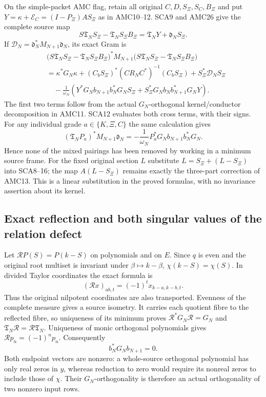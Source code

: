 On the simple-packet AMC flag, retain all original $C,D,S_\Xi,S_C,B_\Xi$
and put $Y=\kappa+\mathcal E_C=(I-P_\Xi)AS_\Xi$ as in AMC10--12.
SCA9 and AMC26 give the complete source map
\[
 S\mathfrak T_NS_\Xi-\mathfrak T_NS_\Xi B_\Xi
             =\mathfrak T_NY+\mathfrak d_NS_\Xi.
 \tag{SCA14}
\]
If $\mathcal D_N=\mathfrak d_N^*M_{N+1}\mathfrak d_N$, its exact Gram is
\[
 \begin{aligned}
 &\bigl(S\mathfrak T_NS_\Xi-\mathfrak T_NS_\Xi B_\Xi\bigr)^*
 M_{N+1}\bigl(S\mathfrak T_NS_\Xi-\mathfrak T_NS_\Xi B_\Xi\bigr)\\
 &=\kappa^*G_N\kappa
 +(C_bS_\Xi)^*(CR_NC^*)^{-1}(C_bS_\Xi)
 +S_\Xi^*\mathcal D_NS_\Xi\\
 &\quad-\frac1{\omega_N}
 \left(Y^*G_Nb_{N+1}b_N^*G_NS_\Xi
      +S_\Xi^*G_Nb_Nb_{N+1}^*G_NY\right).
 \end{aligned}\tag{SCA15}
\]
The first two terms follow from the actual $G_N$-orthogonal kernel/conductor
decomposition in AMC11. SCA12 evaluates both cross terms, with their signs.
For any individual grade $a\in\{K,\Xi,C\}$ the same calculation gives
\[
 (\mathfrak T_NP_a)^*M_{N+1}\mathfrak d_N
   =-\frac1{\omega_N}P_a^*G_Nb_{N+1}b_N^*G_N.
 \tag{SCA16}
\]
Hence none of the mixed pairings has been removed by working in a
minimum source frame. For the fixed original section $L$ substitute
$L=S_\Xi+(L-S_\Xi)$ into SCA8--16; the map $A(L-S_\Xi)$ remains exactly
the three-part correction of AMC13. This is a linear substitution in the
proved formulas, with no invariance assertion about its kernel.

\subsection{Exact reflection and both singular values of the relation defect}

Let $\mathcal R P(S)=P(k-S)$ on polynomials and on $E$. Since $q$ is even
and the original root multiset is invariant under $\beta\mapsto k-\beta$,
$\chi(k-S)=\chi(S)$. In divided Taylor coordinates the exact formula is
\[
 (\mathcal R x)_{ab,t}=(-1)^t x_{k-a,k-b,t}.
 \tag{SCA17}
\]
Thus the original nilpotent coordinates are also transported. Evenness of
the complete measure gives a source isometry. It carries each quotient
fibre to the reflected fibre, so uniqueness of its minimum proves
$\mathcal R^*G_N\mathcal R=G_N$ and
$\mathfrak T_N\mathcal R=\mathcal R\mathfrak T_N$.
Uniqueness of monic orthogonal polynomials gives
$\mathcal Rp_n=(-1)^np_n$. Consequently
\[
 b_N^*G_Nb_{N+1}=0.
 \tag{SCA18}
\]
Both endpoint vectors are nonzero: a whole-source orthogonal polynomial
has only real zeros in $y$, whereas reduction to zero would require its
nonreal zeros to include those of $\chi$. Their $G_N$-orthogonality is
therefore an actual orthogonality of two nonzero input rows.


